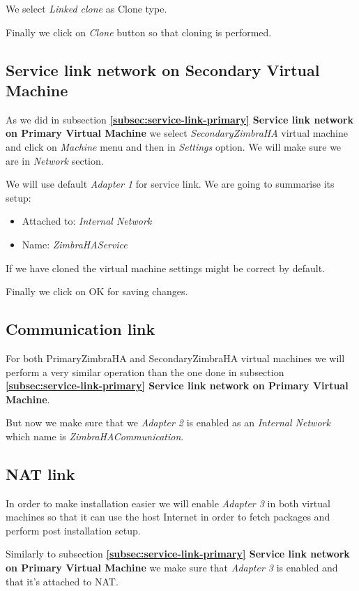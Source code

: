 We select \textit{Linked clone} as Clone type.

Finally we click on \textit{Clone} button so that cloning is performed.

\subsection {Service link network on Secondary Virtual Machine}
As we did in subsection \textbf{\ref{subsec:service-link-primary} Service link network on Primary Virtual Machine} we select \textit{SecondaryZimbraHA} virtual machine and click on \textit{Machine} menu and then in \textit{Settings} option. We will make sure we are in \textit{Network} section.

We will use default \textit{Adapter 1} for service link. We are going to summarise its setup:
\begin{itemize}
  \item Attached to: \textit{Internal Network}
  \item Name: \textit{ZimbraHAService}
\end{itemize}

If we have cloned the virtual machine settings might be correct by default.

Finally we click on OK for saving changes.

\subsection {Communication link}
For both PrimaryZimbraHA and SecondaryZimbraHA virtual machines we will perform a very similar operation than the one done in subsection \textbf{\ref{subsec:service-link-primary} Service link network on Primary Virtual Machine}.

But now we make sure that we \textit{Adapter 2} is enabled as an \textit{Internal Network} which name is \textit{ZimbraHACommunication}.

\subsection {NAT link}
In order to make installation easier we will enable \textit{Adapter 3} in both virtual machines so that it can use the host Internet in order to fetch packages and perform post installation setup.

Similarly to subsection \textbf{\ref{subsec:service-link-primary} Service link network on Primary Virtual Machine} we make sure that \textit{Adapter 3} is enabled and that it's attached to NAT.